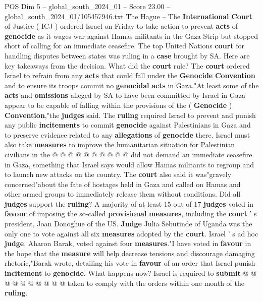 \begin{textsample}{POS Dim 5 – global\_south\_2024\_01 – Score 23.00 – global\_south\_2024\_01/105457946.txt}  \label{ex:f5_pos_006}
The Hague -- The \textbf{International} \textbf{Court} of Justice ( ICJ ) ordered Israel on Friday to take action to prevent \textbf{acts} of \textbf{genocide} as it wages war against Hamas militants in the Gaza Strip but stopped short of calling for an immediate ceasefire.
The top United Nations \textbf{court} for handling disputes between states was ruling in a \textbf{case} brought by SA.
Here are key takeaways from the decision.
What did the \textbf{court} rule?
The \textbf{court} ordered Israel to refrain from any \textbf{acts} that could fall under the \textbf{Genocide} \textbf{Convention} and to ensure its troops commit no \textbf{genocidal} \textbf{acts} in Gaza."At least some of the \textbf{acts} and \textbf{omissions} alleged by SA to have been committed by Israel in Gaza appear to be capable of falling within the provisions of the ( \textbf{Genocide} ) \textbf{Convention},"the \textbf{judges} said.
The \textbf{ruling} required Israel to prevent and punish any public \textbf{incitements} to commit \textbf{genocide} against Palestinians in Gaza and to preserve evidence related to any \textbf{allegations} of \textbf{genocide} there.
Israel must also take \textbf{measures} to improve the humanitarian situation for Palestinian civilians in the @ @ @ @ @ @ @ @ @ @ did not demand an immediate ceasefire in Gaza, something that Israel says would allow Hamas militants to regroup and to launch new attacks on the country.
The \textbf{court} also said it was"gravely concerned"about the fate of hostages held in Gaza and called on Hamas and other armed groups to immediately release them without conditions.
Did all \textbf{judges} support the \textbf{ruling}?
A majority of at least 15 out of 17 \textbf{judges} voted in \textbf{favour} of imposing the so-called \textbf{provisional} \textbf{measures}, including the \textbf{court} ' s president, Joan Donoghue of the US. \textbf{Judge} Julia Sebutinde of Uganda was the only one to vote against all six \textbf{measures} adopted by the \textbf{court}.
Israel ' s ad hoc \textbf{judge}, Aharon Barak, voted against four \textbf{measures}."I have voted in \textbf{favour} in the hope that the \textbf{measure} will help decrease tensions and discourage damaging rhetoric,"Barak wrote, detailing his vote in \textbf{favour} of an order that Israel punish \textbf{incitement} to \textbf{genocide}.
What happens now?
Israel is required to \textbf{submit} @ @ @ @ @ @ @ @ @ @ taken to comply with the orders within one month of the \textbf{ruling}.

\end{textsample}
